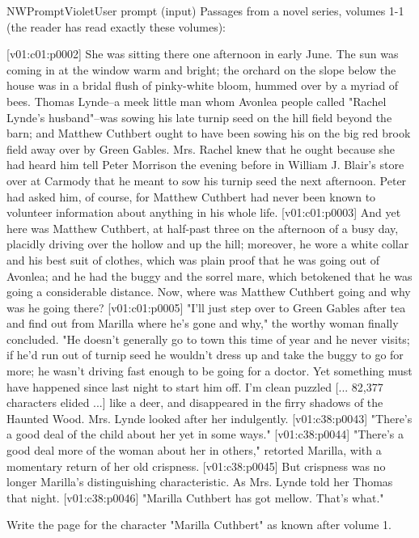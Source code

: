\begin{nwprompt}{NWPromptViolet}{User prompt (input)}
Passages from a novel series, volumes 1-1 (the reader has read exactly these volumes):

[v01:c01:p0002] She was sitting there one afternoon in early June. The sun was coming in at the window warm and bright; the orchard on the slope below the house was in a bridal flush of pinky-white bloom, hummed over by a myriad of bees. Thomas Lynde--a meek little man whom Avonlea people called "Rachel Lynde's husband"--was sowing his late turnip seed on the hill field beyond the barn; and Matthew Cuthbert ought to have been sowing his on the big red brook field away over by Green Gables. Mrs. Rachel knew that he ought because she had heard him tell Peter Morrison the evening before in William J. Blair's store over at Carmody that he meant to sow his turnip seed the next afternoon. Peter had asked him, of course, for Matthew Cuthbert had never been known to volunteer information about anything in his whole life.
[v01:c01:p0003] And yet here was Matthew Cuthbert, at half-past three on the afternoon of a busy day, placidly driving over the hollow and up the hill; moreover, he wore a white collar and his best suit of clothes, which was plain proof that he was going out of Avonlea; and he had the buggy and the sorrel mare, which betokened that he was going a considerable distance. Now, where was Matthew Cuthbert going and why was he going there?
[v01:c01:p0005] "I'll just step over to Green Gables after tea and find out from Marilla where he's gone and why," the worthy woman finally concluded. "He doesn't generally go to town this time of year and he never visits; if he'd run out of turnip seed he wouldn't dress up and take the buggy to go for more; he wasn't driving fast enough to be going for a doctor. Yet something must have happened since last night to start him off. I'm clean puzzled
[... 82,377 characters elided ...]
like a deer, and disappeared in the firry shadows of the Haunted Wood. Mrs. Lynde looked after her indulgently.
[v01:c38:p0043] "There's a good deal of the child about her yet in some ways."
[v01:c38:p0044] "There's a good deal more of the woman about her in others," retorted Marilla, with a momentary return of her old crispness.
[v01:c38:p0045] But crispness was no longer Marilla's distinguishing characteristic. As Mrs. Lynde told her Thomas that night.
[v01:c38:p0046] "Marilla Cuthbert has got mellow. That's what."

Write the page for the character "Marilla Cuthbert" as known after volume 1.
\end{nwprompt}

